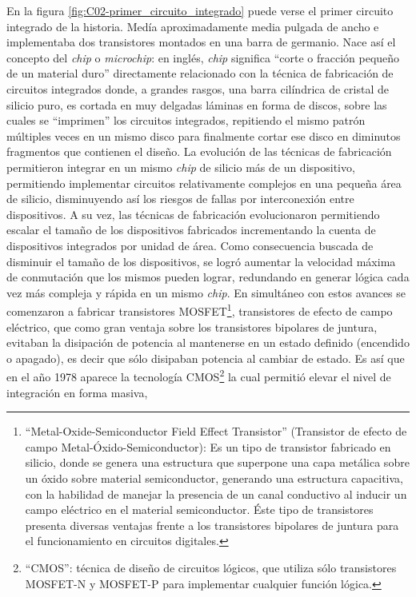 En la figura \ref{fig:C02-primer_circuito_integrado} puede verse el primer
circuito integrado de la historia. Medía aproximadamente media pulgada de ancho
e implementaba dos transistores montados en una barra de germanio. Nace así el
concepto del \emph{chip} o \emph{microchip}: en inglés, \emph{chip} significa
``corte o fracción pequeño de un material duro'' directamente relacionado con la
técnica de fabricación de circuitos integrados donde, a grandes rasgos, una
barra cilíndrica de cristal de silicio puro, es cortada en muy delgadas láminas
en forma de discos, sobre las cuales se ``imprimen'' los circuitos integrados,
repitiendo el mismo patrón múltiples veces en un mismo disco para finalmente
cortar ese disco en diminutos fragmentos que contienen el diseño. La evolución
de las técnicas de fabricación permitieron integrar en un mismo \emph{chip} de
silicio más de un dispositivo, permitiendo implementar circuitos relativamente
complejos en una pequeña área de silicio, disminuyendo así los riesgos de fallas
por interconexión entre dispositivos. A su vez, las técnicas de fabricación
evolucionaron permitiendo escalar el tamaño de los dispositivos fabricados
incrementando la cuenta de dispositivos integrados por unidad de área. Como
consecuencia buscada de disminuir el tamaño de los dispositivos, se logró
aumentar la velocidad máxima de conmutación que los mismos pueden lograr,
redundando en generar lógica cada vez más compleja y rápida en un mismo
\emph{chip}. En simultáneo con estos avances se comenzaron a fabricar
transistores MOSFET\footnote{``Metal-Oxide-Semiconductor Field Effect
Transistor'' (Transistor de efecto de campo Metal-Óxido-Semiconductor): Es un
tipo de transistor fabricado en silicio, donde se genera una estructura que
superpone una capa metálica sobre un óxido sobre material semiconductor,
generando una estructura capacitiva, con la habilidad de manejar la presencia de
un canal conductivo al inducir un campo eléctrico en el material semiconductor.
Éste tipo de transistores presenta diversas ventajas frente a los transistores
bipolares de juntura para el funcionamiento en circuitos digitales.},
transistores de efecto de campo eléctrico, que como gran ventaja sobre los
transistores bipolares de juntura, evitaban la disipación de potencia al
mantenerse en un estado definido (encendido o apagado), es decir que sólo
disipaban potencia al cambiar de estado. Es así que en el año 1978 aparece la
tecnología CMOS\footnote{``CMOS'': técnica de diseño de circuitos lógicos, que
utiliza sólo transistores MOSFET-N y MOSFET-P para implementar cualquier función
lógica.} la cual permitió elevar el nivel de integración en forma masiva,
